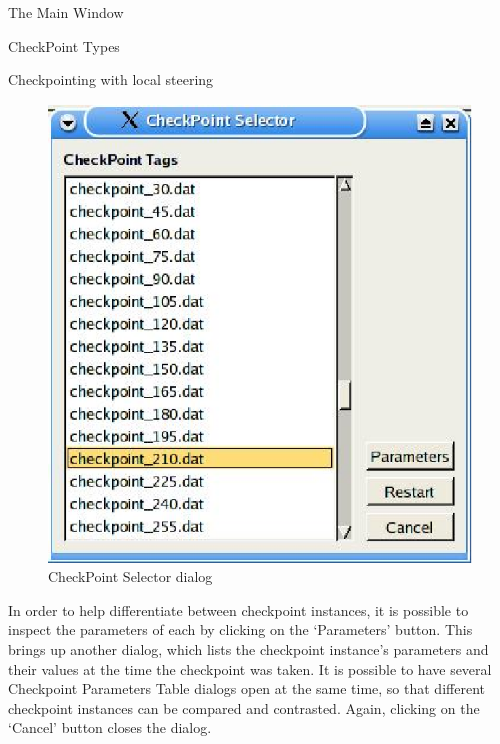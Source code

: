 \documentclass[a4paper,twoside]{article}
\begin{document}
\begin{section}{The Main Window}
\begin{subsection}{CheckPoint Types}
\begin{subsubsection}{Checkpointing with local steering}
\begin{figure}
\centerline{\includegraphics{chk_list.eps}}
\caption{CheckPoint Selector dialog}
\label{fig:chk_list_dialog}
\end{figure}

In order to help differentiate between checkpoint instances, it is
possible to inspect the parameters of each by clicking on the
`Parameters' button. This brings up another dialog, which lists the
checkpoint instance's parameters and their values at the time the
checkpoint was taken. It is possible to have several Checkpoint
Parameters Table dialogs open at the same time, so that different
checkpoint instances can be compared and contrasted.  Again, clicking
on the `Cancel' button closes the dialog.


\end{subsubsection}
\end{subsection}
\end{section}
\end{document}
